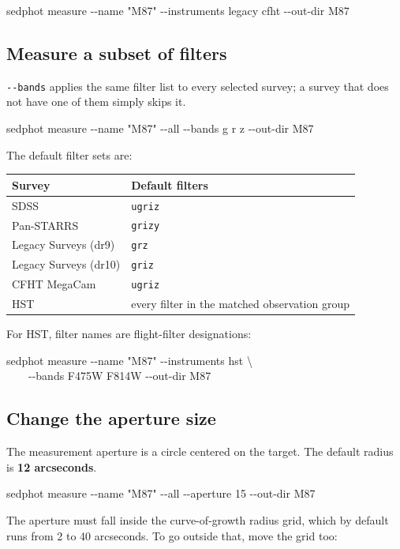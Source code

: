 \documentclass[11pt]{article}
\newcommand{\cmdline}[1]{\begin{cmd}\ttfamily #1\end{cmd}}
\begin{document}
\cmdline{sedphot measure -{}-name "M87" -{}-instruments legacy cfht -{}-out-dir M87}

\subsection{Measure a subset of filters}

\texttt{-{}-bands} applies the same filter list to every selected survey;
a survey that does not have one of them simply skips it.

\cmdline{sedphot measure -{}-name "M87" -{}-all -{}-bands g r z -{}-out-dir M87}

The default filter sets are:

\begin{center}
\begin{tabular}{L{5.2cm} L{7.6cm}}
\toprule
\textbf{Survey} & \textbf{Default filters} \\
\midrule
SDSS & \texttt{ugriz} \\
Pan-STARRS & \texttt{grizy} \\
Legacy Surveys (dr9) & \texttt{grz} \\
Legacy Surveys (dr10) & \texttt{griz} \\
CFHT MegaCam & \texttt{ugriz} \\
HST & every filter in the matched observation group \\
\bottomrule
\end{tabular}
\end{center}

For HST, filter names are flight-filter designations:

\begin{cmd}\ttfamily\frenchspacing
sedphot measure -{}-name "M87" -{}-instruments hst \textbackslash\\
\mbox{}~~~~-{}-bands F475W F814W -{}-out-dir M87
\end{cmd}

\subsection{Change the aperture size}

The measurement aperture is a circle centered on the target. The default
radius is \textbf{12 arcseconds}.

\cmdline{sedphot measure -{}-name "M87" -{}-all -{}-aperture 15 -{}-out-dir M87}

The aperture must fall inside the curve-of-growth radius grid, which by
default runs from 2 to 40 arcseconds. To go outside that, move the grid
too:
\end{document}
